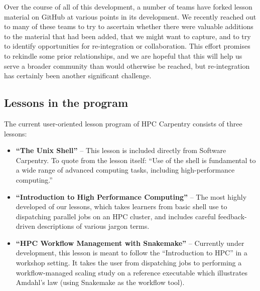 Over the course of all of this development, a number of teams have forked lesson material on GitHub at various points in its development. We recently reached out to many of these teams to try to ascertain whether there were valuable additions to the material that had been added, that we might want to capture, and to try to identify opportunities for re-integration or collaboration. This effort promises to rekindle some prior relationships, and we are hopeful that this will help us serve a broader community than would otherwise be reached, but re-integration has certainly been another significant challenge.


\subsection{Lessons in the program}

The current user-oriented lesson program of HPC Carpentry consists of three lessons:

\begin{itemize}
    \item \textbf{``The Unix Shell''} \cite{aldazabal_mensa_2016_57544} --
    This lesson is included directly from Software Carpentry. To quote from the lesson itself: ``Use of the shell is fundamental to a wide range of advanced computing tasks, including high-performance computing.''
    
    \item \textbf{``Introduction to High Performance Computing''} \cite{hpcintro} -- 
    The most highly developed of our lessons, which takes learners from basic shell use to dispatching parallel jobs on an HPC cluster, and includes careful feedback-driven descriptions of various jargon terms.
    
    \item \textbf{``HPC Workflow Management with Snakemake''} \cite{hpcworkflows} -- 
    Currently under development, this lesson is meant to follow the ``Introduction to HPC'' in a workshop setting. It takes the user from dispatching jobs to performing a workflow-managed scaling study on a reference executable which illustrates Amdahl's law  (using Snakemake \cite{Mlder2021} as the workflow tool).
\end{itemize}

